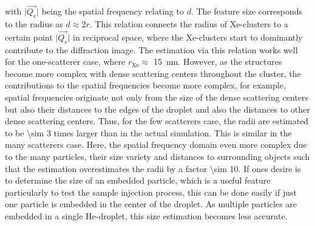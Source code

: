with $\lvert\vec{Q_{r}}\rvert$ being the spatial frequency relating to $d$. The feature size corresponds to the radius as $d\approx 2 r$. This relation connects the radius of Xe-clusters to a certain point $\lvert\vec{Q_{r}}\rvert$ in reciprocal space, where the Xe-clusters start to dominantly contribute to the diffraction image. The estimation via this relation works well for the one-scatterer case, where $r_{\text{Xe}}\approx$ \SI{15}{\nano\meter}. However, as the structures become more complex with dense scattering centers throughout the cluster, the contributions to the spatial frequencies become more complex, for example, spatial frequencies originate not only from the size of the dense scattering centers but also their distances to the edges of the droplet and also the distances to other dense scattering centers. Thus, for the few scatterers case, the radii are estimated to be \num{\sim 3} times larger than in the actual simulation. This is similar in the many scatterers case. Here, the spatial frequency domain even more complex due to the many particles, their size variety and distances to surrounding objects such that the estimation overestimates the radii by a factor \num{\sim 10}. If ones desire is to determine the size of an embedded particle, which is a useful feature particularly to test the sample injection process, this can be done easily if just one particle is embedded in the center of the droplet. As multiple particles are embedded in a single He-droplet, this size estimation becomes less accurate.\\[1\baselineskip]
%
